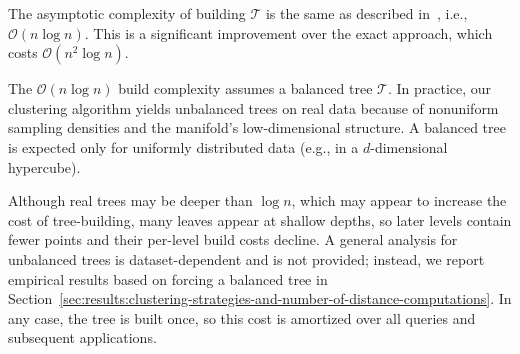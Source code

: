 The asymptotic complexity of building $\mathcal{T}$ is the same as described in~\cite{ishaq2019clustered}, i.e., $\mathcal{O}(n \log n)$.
This is a significant improvement over the exact approach, which costs $\mathcal{O}(n^2 \log n)$.



The $\mathcal{O}(n\log n)$ build complexity assumes a balanced tree $\mathcal{T}$. In practice, our clustering algorithm yields unbalanced trees on real data because of nonuniform sampling densities and the manifold’s low-dimensional structure. A balanced tree is expected only for uniformly distributed data (e.g., in a $d$-dimensional hypercube).

Although real trees may be deeper than $\log n$, which may appear to increase the cost of tree-building, many leaves appear at shallow depths, so later levels contain fewer points and their per-level build costs decline. A general analysis for unbalanced trees is dataset-dependent and is not provided; instead, we report empirical results based on forcing a balanced tree in Section~\ref{sec:results:clustering-strategies-and-number-of-distance-computations}. In any case, the tree is built once, so this cost is amortized over all queries and subsequent applications.


